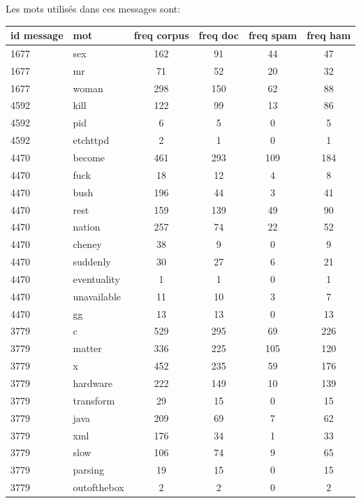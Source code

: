 \documentclass[a4paper,12pt]{article}
\begin{document}
			Les mots utilisés dans ces messages sont:\\
			\begin{tabular}{|l|l|c|c|c|c|}
				\hline
				id message & mot & freq corpus & freq doc & freq spam & freq ham \\
				\hline
				1677 & sex & 162 & 91 & 44 & 47 \\
				\hline
				1677 & mr & 71 & 52 & 20 & 32 \\
				\hline
				1677 & woman & 298 & 150 & 62 & 88 \\
				\hline
				4592 & kill & 122 & 99 & 13 & 86 \\
				\hline
				4592 & pid & 6 & 5 & 0 & 5 \\
				\hline
				4592 & etchttpd & 2 & 1 & 0 & 1 \\
				\hline
				4470 & become & 461 & 293 & 109 & 184 \\
				\hline
				4470 & fuck & 18 & 12 & 4 & 8 \\
				\hline
				4470 & bush & 196 & 44 & 3 & 41 \\
				\hline
				4470 & rest & 159 & 139 & 49 & 90 \\
				\hline
				4470 & nation & 257 & 74 & 22 & 52 \\
				\hline
				4470 & cheney & 38 & 9 & 0 & 9 \\
				\hline
				4470 & suddenly & 30 & 27 & 6 & 21 \\
				\hline
				4470 & eventuality & 1 & 1 & 0 & 1 \\
				\hline
				4470 & unavailable & 11 & 10 & 3 & 7 \\
				\hline
				4470 & gg & 13 & 13 & 0 & 13 \\
				\hline
				3779 & c & 529 & 295 & 69 & 226 \\
				\hline
				3779 & matter & 336 & 225 & 105 & 120 \\
				\hline
				3779 & x & 452 & 235 & 59 & 176 \\
				\hline
				3779 & hardware & 222 & 149 & 10 & 139 \\
				\hline
				3779 & transform & 29 & 15 & 0 & 15 \\
				\hline
				3779 & java & 209 & 69 & 7 & 62 \\
				\hline
				3779 & xml & 176 & 34 & 1 & 33 \\
				\hline
				3779 & slow & 106 & 74 & 9 & 65 \\
				\hline
				3779 & parsing & 19 & 15 & 0 & 15 \\
				\hline
				3779 & outofthebox & 2 & 2 & 0 & 2 \\

\end{tabular}
\end{document}
